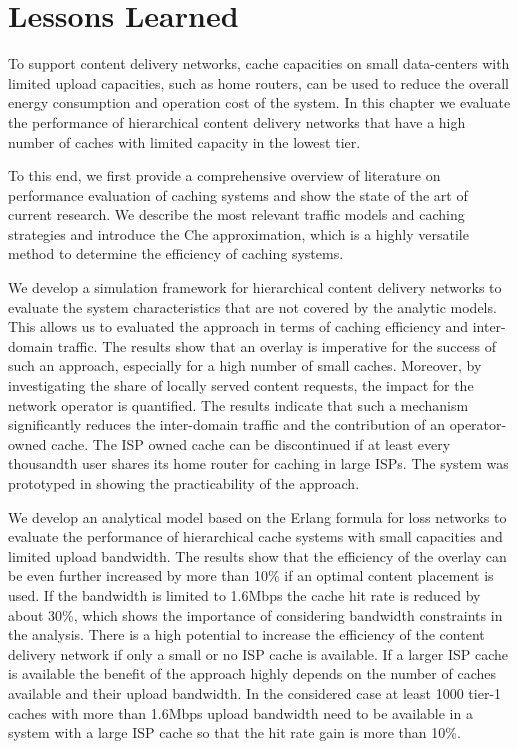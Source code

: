 \section{Lessons Learned}\label{sec:cloud:lessons_learned}
To support content delivery networks, cache capacities on small data-centers with limited upload capacities, such as home routers, can be used to reduce the overall energy consumption and operation cost of the system.
In this chapter we evaluate the performance of hierarchical content delivery networks that have a high number of caches with limited capacity in the lowest tier.

To this end, we first provide a comprehensive overview of literature on performance evaluation of caching systems and show the state of the art of current research.
We describe the most relevant traffic models and caching strategies and introduce the Che approximation, which is a highly versatile method to determine the efficiency of caching systems.

We develop a simulation framework for hierarchical content delivery networks to evaluate the system characteristics that are not covered by the analytic models.
This allows us to evaluated the approach in terms of caching efficiency and inter-domain traffic.
The results show that an overlay is imperative for the success of such an approach, especially for a high number of small caches.
Moreover, by investigating the share of locally served content requests, the impact for the network operator is quantified.
The results indicate that such a mechanism significantly reduces the inter-domain traffic and the contribution of an operator-owned cache.
The ISP owned cache can be discontinued if at least every thousandth user shares its home router for caching in large ISPs.
The system was prototyped in \cite{rbhorst-demo} showing the practicability of the approach.

We develop an analytical model based on the Erlang formula for loss networks to evaluate the performance of hierarchical cache systems with small capacities and limited upload bandwidth.
The results show that the efficiency of the overlay can be even further increased by more than 10\% if an optimal content placement is used.
If the bandwidth is limited to 1.6Mbps the cache hit rate is reduced by about 30\%, which shows the importance of considering bandwidth constraints in the analysis.
There is a high potential to increase the efficiency of the content delivery network if only a small or no ISP cache is available.
If a larger ISP cache is available the benefit of the approach highly depends on the number of caches available and their upload bandwidth.
In the considered case at least 1000 tier-1 caches with more than 1.6Mbps upload bandwidth need to be available in a system with a large ISP cache so that the hit rate gain is more than 10\%.

